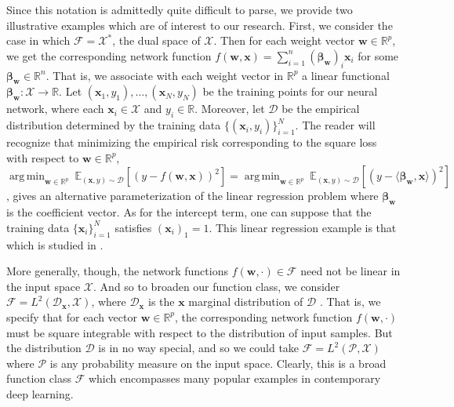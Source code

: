 \documentclass{article}
\DeclareMathOperator*{\argmin}{arg\,min}
\begin{document}
Since this notation is admittedly quite difficult to parse, we provide two illustrative examples which are of interest to our research. First, we consider the case in which $\mathcal{F} = \mathcal{X}^*$, the dual space of $\mathcal{X}$. Then for each weight vector $\boldsymbol{w} \in \mathbb{R}^p$, we get the corresponding network function $f(\boldsymbol{w}, \boldsymbol{x}) = \sum_{i=1}^n (\boldsymbol{\beta}_{\boldsymbol{w}})_i\boldsymbol{x}_i$ for some $\boldsymbol{\beta}_{\boldsymbol{w}} \in \mathbb{R}^n$. That is, we associate with each weight vector in $\mathbb{R}^p$ a linear functional $\boldsymbol{\beta}_{\boldsymbol{w}}: \mathcal{X} \rightarrow \mathbb{R}$. Let $(\boldsymbol{x}_1, y_1), \ldots, (\boldsymbol{x}_N, y_N)$ be the training points for our neural network, where each $\boldsymbol{x}_i \in \mathcal{X}$ and $y_i \in \mathbb{R}$. Moreover, let $\mathcal{D}$ be the empirical distribution determined by the training data $\{(\boldsymbol{x}_i, y_i) \}_{i=1}^N$. The reader will recognize that minimizing the empirical risk corresponding to the square loss with respect to $\boldsymbol{w} \in \mathbb{R}^p$, $\argmin_{\boldsymbol{w} \in \mathbb{R}^p} \ \mathbb{E}_{(\boldsymbol{x}, y) \sim \mathcal{D}}\left[\left(y - f(\boldsymbol{w}, \boldsymbol{x}) \right)^2 \right] = \argmin_{\boldsymbol{w} \in \mathbb{R}^p} \ \mathbb{E}_{(\boldsymbol{x}, y) \sim \mathcal{D}}\left[\left(y - \langle \boldsymbol{\beta}_{\boldsymbol{w}}, \boldsymbol{x} \rangle \right)^2 \right]$, gives an alternative parameterization of the linear regression problem where $\boldsymbol{\beta}_{\boldsymbol{w}}$ is the coefficient vector. As for the intercept term, one can suppose that the training data $\{ \boldsymbol{x}_i \}_{i=1}^N$ satisfies $(\boldsymbol{x}_i)_1 = 1$. This linear regression example is that which is studied in \cite{woodworth2020kernel}. 

More generally, though, the network functions $f(\boldsymbol{w}, \cdot) \in \mathcal{F}$ need not be linear in the input space $\mathcal{X}$. And so to broaden our function class, we consider $\mathcal{F} = L^2(\mathcal{D}_{\boldsymbol{x}}, \mathcal{X})$, where $\mathcal{D}_{\boldsymbol{x}}$ is the $\boldsymbol{x}$ marginal distribution of $\mathcal{D}$ \cite{chizat2019lazy}. That is, we specify that for each vector $\boldsymbol{w} \in \mathbb{R}^p$, the corresponding network function $f(\boldsymbol{w}, \cdot)$ must be square integrable with respect to the distribution of input samples. But the distribution $\mathcal{D}$ is in no way special, and so we could take $\mathcal{F} = L^2(\mathcal{P}, \mathcal{X})$ where $\mathcal{P}$ is any probability measure on the input space. Clearly, this is a broad function class $\mathcal{F}$ which encompasses many popular examples in contemporary deep learning.
\end{document}
